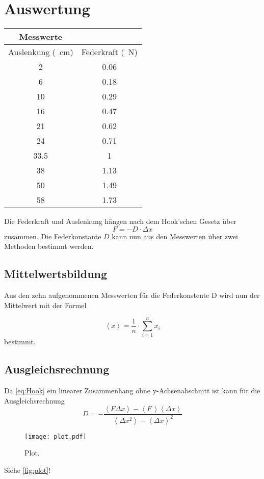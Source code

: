 \section{Auswertung}
\label{sec:Auswertung}
\begin{table}
  \centering
  \begin{tabular}{c c}
  \toprule
  Messwerte\\  
  \midrule 
  Auslenkung (\SI{}{\centi\meter}) & Federkraft (\SI{}{\newton})\\ 
  \midrule 
  2 & 0.06 \\
  6 & 0.18 \\
  10 & 0.29 \\
  16 & 0.47 \\
  21 & 0.62 \\
  24 & 0.71 \\
  33.5 & 1 \\
  38 & 1.13 \\
  50 & 1.49 \\
  58 & 1.73 \\ 
  \bottomrule
  \end{tabular}
\end{table} 
Die Federkraft und Auslenkung hängen nach dem Hook'schen Gesetz über
\begin{equation}
  \label{eq:Hook}
  F = - D \cdot \Delta x
\end{equation}
zusammen.
Die Federkonstante $D$ kann nun aus den Messwerten über zwei Methoden bestimmt werden.

\subsection{Mittelwertsbildung}
Aus den zehn aufgenommenen Messwerten für die Federkonstente D wird nun der Mittelwert mit der Formel

\begin{equation}
  \label{eq:Mittelwert}
  \left< x \right> = \frac{1}{n} \cdot \sum_{i=1}^{n} x_i
\end{equation}
bestimmt. 

\subsection{Ausgleichsrechnung}

Da \eqref{eq:Hook} ein linearer Zusammenhang ohne y-Achsenabschnitt ist kann für die Ausgleichsrechnung
\begin{equation}
  \label{eq:Lin-Ausgleich}
  D = - \frac
  {\left< F \Delta x \right> - \left< F \, \right> \left< \Delta x \right>}
  {\left< \Delta x^2 \right> - \left< \Delta x \right> ^2}
\end{equation}

\begin{figure}
  \centering
  \texttt{[image: plot.pdf]}
  \caption{Plot.}
  \label{fig:plot}
\end{figure}


Siehe \autoref{fig:plot}!
